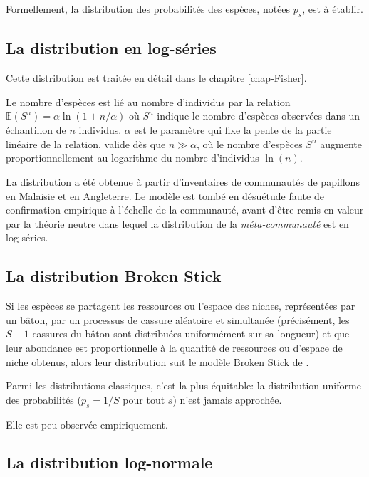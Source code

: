 \documentclass[
  11pt,
  american,
  a4paper,
  extrafontsizes,onecolumn,openright
  ]{memoir}
\begin{document}
Formellement, la distribution des probabilités des espèces, notées \(p_s\), est à établir.

\hypertarget{la-distribution-en-log-suxe9ries}{%
\subsection{La distribution en log-séries}\label{la-distribution-en-log-suxe9ries}}

Cette distribution est traitée en détail dans le chapitre \ref{chap-Fisher}.

Le nombre d'espèces est lié au nombre d'individus par la relation \({\mathbb E}(S^n) = \alpha \ln(1 + n / \alpha)\) où \(S^n\) indique le nombre d'espèces observées dans un échantillon de \(n\) individus.
\(\alpha\) est le paramètre qui fixe la pente de la partie linéaire de la relation, valide dès que \(n \gg \alpha\), où le nombre d'espèces \(S^n\) augmente proportionnellement au logarithme du nombre d'individus \(\ln(n)\).

La distribution a été obtenue à partir d'inventaires de communautés de papillons en Malaisie et en Angleterre.
Le modèle est tombé en désuétude faute de confirmation empirique à l'échelle de la communauté, avant d'être remis en valeur par la théorie neutre \autocite{Hubbell2001} dans lequel la distribution de la \emph{méta-communauté} est en log-séries.

\hypertarget{la-distribution-broken-stick}{%
\subsection{La distribution Broken Stick}\label{la-distribution-broken-stick}}

Si les espèces se partagent les ressources ou l'espace des niches, représentées par un bâton, par un processus de cassure aléatoire et simultanée (précisément, les \(S-1\) cassures du bâton sont distribuées uniformément sur sa longueur) et que leur abondance est proportionnelle à la quantité de ressources ou d'espace de niche obtenus, alors leur distribution suit le modèle Broken Stick de \textcite{MacArthur1957}.

Parmi les distributions classiques, c'est la plus équitable: la distribution uniforme des probabilités (\(p_s = 1 / S\) pour tout \(s\)) n'est jamais approchée.

Elle est peu observée empiriquement.

\hypertarget{la-distribution-log-normale}{%
\subsection{La distribution log-normale}\label{la-distribution-log-normale}}
\end{document}
